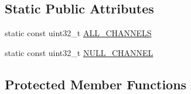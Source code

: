 \subsection*{Static Public Attributes}
\begin{DoxyCompactItemize}
\item 
static const uint32\+\_\+t \hyperlink{classCRTSFilter_a9ea354654e8e2e8ce3bff293cc35fafe}{A\+L\+L\+\_\+\+C\+H\+A\+N\+N\+E\+LS}
\item 
static const uint32\+\_\+t \hyperlink{classCRTSFilter_af731176aa73539af3cfc69b6c1051f82}{N\+U\+L\+L\+\_\+\+C\+H\+A\+N\+N\+EL}
\end{DoxyCompactItemize}
\subsection*{Protected Member Functions}
